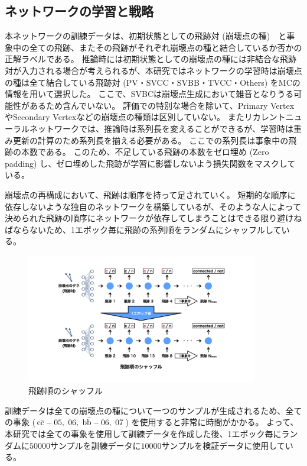 \subsection{ネットワークの学習と戦略} \label{Net:VLSTM:TrainingandStrategyofVLSTM}

本ネットワークの訓練データは、初期状態としての飛跡対 (崩壊点の種)　と事象中の全ての飛跡、またその飛跡がそれぞれ崩壊点の種と結合しているか否かの正解ラベルである。
推論時には初期状態としての崩壊点の種には非結合な飛跡対が入力される場合が考えられるが、本研究ではネットワークの学習時は崩壊点の種は全て結合している飛跡対 (PV・SVCC・SVBB・TVCC・Others) をMCの情報を用いて選択した。
ここで、SVBCは崩壊点生成において雑音となりうる可能性があるため含んでいない。
評価での特別な場合を除いて、Primary VertexやSecondary Vertexなどの崩壊点の種類は区別していない。
またリカレントニューラルネットワークでは、推論時は系列長を変えることができるが、学習時は重み更新の計算のため系列長を揃える必要がある。
ここでの系列長は事象中の飛跡の本数である。
このため、不足している飛跡の本数をゼロ埋め (Zero padding) し、ゼロ埋めした飛跡が学習に影響しないよう損失関数をマスクしている。

崩壊点の再構成において、飛跡は順序を持って足されていく。
短期的な順序に依存しないような独自のネットワークを構築しているが、そのような人によって決められた飛跡の順序にネットワークが依存してしまうことはできる限り避けねばならないため、1エポック毎に飛跡の系列順をランダムにシャッフルしている。

\begin{figure}[htbp]
 \centering
 \includegraphics[trim = 150 50 150 0, width=0.9\textwidth, clip]{Figure/3Networks/3-4-3-1TrackShuffle.png}
 \caption{飛跡順のシャッフル}
 \label{3-4-3-1TrackShuffle}
\end{figure}

訓練データは全ての崩壊点の種について一つのサンプルが生成されるため、全ての事象 ($\rm c\bar{c}-05,\ 06,\ \rm b\bar{b}-06,\ 07$) を使用すると非常に時間がかかる。
よって、本研究では全ての事象を使用して訓練データを作成した後、1エポック毎にランダムに$50000$サンプルを訓練データに$10000$サンプルを検証データに使用している。



